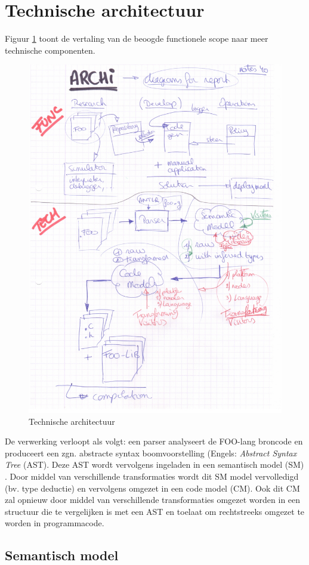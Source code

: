 \section{Technische architectuur}
\label{section:arch-technical}

Figuur \ref{fig:arch-technical} toont de vertaling van de beoogde functionele
scope naar meer technische componenten. 

\begin{figure}[ht]
  \centering
  \includegraphics[width=0.7\linewidth]{resources/arch-technical.pdf}
  \caption{Technische architectuur}
  \label{fig:arch-technical}
\end{figure}

De verwerking verloopt als volgt: een parser analyseert de FOO-lang broncode en
produceert een zgn. abstracte syntax boomvoorstelling (Engels: \emph{Abstract
Syntax Tree} (AST). Deze AST wordt vervolgens ingeladen in een semantisch model
(SM) \citep{fowler2010domain}. Door middel van verschillende transformaties
wordt dit SM model vervolledigd (bv. type deductie) en vervolgens omgezet in
een code model (CM). Ook dit CM zal opnieuw door middel van verschillende
transformaties omgezet worden in een structuur die te vergelijken is met een
AST en toelaat om rechtstreeks omgezet te worden in programmacode.

\subsection{Semantisch model}
\label{subsection:arch-semantic-model}


